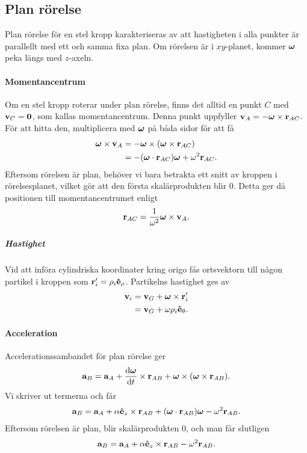 \subsection{Plan rörelse}
Plan rörelse för en stel kropp karakteriseras av att hastigheten i alla punkter är parallellt med ett och samma fixa plan. Om rörelsen är i $xy$-planet, kommer $\vb*{\omega}$ peka längs med $z$-axeln.

\paragraph{Momentancentrum}
Om en stel kropp roterar under plan rörelse, finns det alltid en punkt $C$ med $\vb{v}_{C} = \vb{0}$, som kallas momentancentrum. Denna punkt uppfyller $\vb{v}_{A} = -\vb*{\omega}\times\vb{r}_{AC}$. För att hitta den, multiplicera med $\vb*{\omega}$ på båda sidor för att få
\begin{align*}
	\vb*{\omega}\times\vb{v}_{A} &= -\vb*{\omega}\times(\vb*{\omega}\times\vb{r}_{AC}) \\
	                             &= -(\vb*{\omega}\cdot\vb{r}_{AC})\vb*{\omega} + \omega^2\vb{r}_{AC}.
\end{align*}
Eftersom rörelsen är plan, behöver vi bara betrakta ett snitt av kroppen i rörelsesplanet, vilket gör att den första skalärprodukten blir $0$. Detta ger då positionen till momentancentrumet enligt
\begin{align*}
	\vb{r}_{AC} = \frac{1}{\omega^2}\vb*{\omega}\times\vb{v}_{A}.
\end{align*}

\subparagraph{Hastighet}
Vid att införa cylindriska koordinater kring origo fås ortsvektorn till någon partikel i kroppen som $\vb{r}_{i}' = \rho_{i}\vu{e}_{\rho}$. Partikelns hastighet ges av
\begin{align*}
	\vb{v}_{i} &= \vb{v}_{G} + \vb*{\omega}\times\vb{r}_{i}' \\
	           &= \vb{v}_{G} + \omega\rho_{i}\vu{e}_{\theta}.
\end{align*}

\paragraph{Acceleration}
Accelerationssambandet för plan rörelse ger
\begin{align*}
	\vb{a}_{B} = \vb{a}_{A} + \dv{\vb*{\omega}}{t}\times\vb{r}_{AB} + \vb*{\omega}\times(\vb*{\omega}\times\vb{r}_{AB}).
\end{align*}
Vi skriver ut termerna och får
\begin{align*}
	\vb{a}_{B} = \vb{a}_{A} + \alpha\vu{e}_{z}\times\vb{r}_{AB} + (\vb*{\omega}\cdot\vb{r}_{AB})\vb*{\omega} - \omega^2\vb{r}_{AB}.
\end{align*}
Eftersom rörelsen är plan, blir skalärprodukten $0$, och man får slutligen
\begin{align*}
	\vb{a}_{B} = \vb{a}_{A} + \alpha\vu{e}_{z}\times\vb{r}_{AB} - \omega^2\vb{r}_{AB}.
\end{align*}

